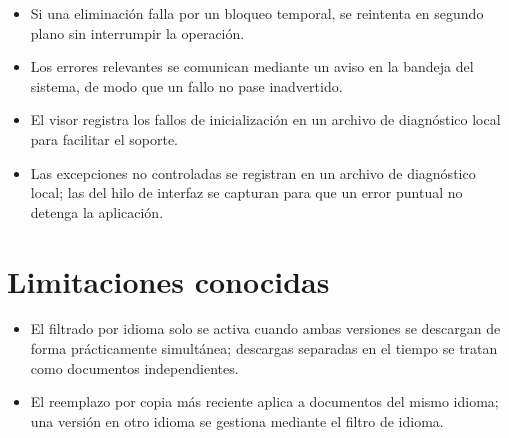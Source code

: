 \documentclass[11pt,a4paper]{article}
\begin{document}
\begin{itemize}[leftmargin=1.4em,itemsep=2pt]
  \item Si una eliminación falla por un bloqueo temporal, se reintenta en segundo
        plano sin interrumpir la operación.
  \item Los errores relevantes se comunican mediante un aviso en la bandeja del
        sistema, de modo que un fallo no pase inadvertido.
  \item El visor registra los fallos de inicialización en un archivo de
        diagnóstico local para facilitar el soporte.
  \item Las excepciones no controladas se registran en un archivo de diagnóstico
        local; las del hilo de interfaz se capturan para que un error puntual no
        detenga la aplicación.
\end{itemize}

\section{Limitaciones conocidas}
\begin{itemize}[leftmargin=1.4em,itemsep=3pt]
  \item El filtrado por idioma solo se activa cuando ambas versiones se descargan
        de forma prácticamente simultánea; descargas separadas en el tiempo se
        tratan como documentos independientes.
  \item El reemplazo por copia más reciente aplica a documentos del mismo idioma;
        una versión en otro idioma se gestiona mediante el filtro de idioma.
\end{itemize}

\end{document}
